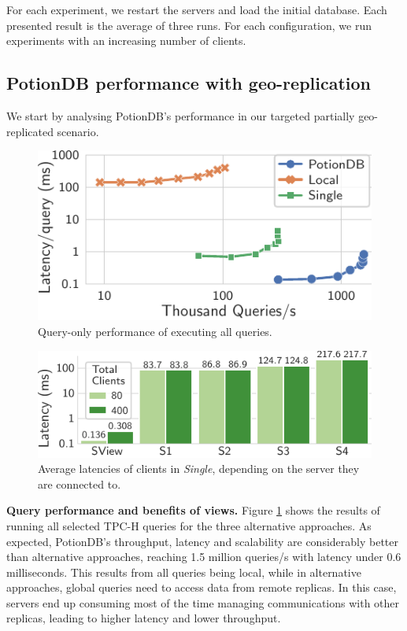 \documentclass[sigplan,twocolumn,review,anonymous]{acmart}
\begin{document}
For each experiment, we restart the servers and load the initial database. 
Each presented result is the average of three runs. 
For each configuration, we run experiments with an increasing number of clients. 



\subsection{PotionDB performance with geo-replication}

We start by analysing PotionDB's performance in our targeted partially geo-replicated scenario.

\begin{figure}
	\centering
	\includegraphics[width=0.6\linewidth]{singleQuery/all_queries_tc}
	\vspace*{-0.75em}
	\caption{Query-only performance of executing all queries.}
	\label{fig:global_local_single_tc}
	\vspace*{-0.9em}
\end{figure}%
\begin{figure}
	\centering
	\includegraphics[width=0.72\linewidth]{singleQuery/single_TC_latencies}
	\vspace*{-0.6em}
	\caption{Average latencies of clients in \textit{Single}, depending on the server they are connected to.}
	\label{fig:single_tc_latencies}
	\vspace*{-1em}
\end{figure}%

\noindent
\textbf{Query performance and benefits of views.}
Figure \ref{fig:global_local_single_tc} shows the results of running all selected TPC-H queries for the three alternative approaches. 
As expected, PotionDB's throughput, latency and scalability are considerably better than alternative approaches, reaching 
1.5 million queries/s with latency under 0.6 milliseconds. 
This results from all queries being local, while in alternative approaches, global queries need to access data from 
remote replicas. In this case, servers end up consuming most of the time managing communications with other replicas, leading 
to higher latency 
and lower throughput. 
\end{document}
